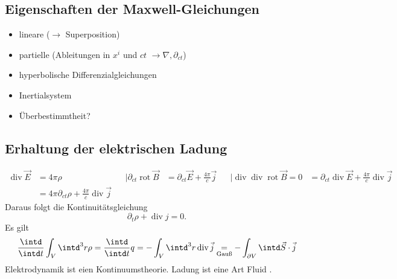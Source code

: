 \documentclass{article}
\newcommand{\rot}{\operatorname{rot}}
\renewcommand{\div}{\operatorname{div}}
\begin{document}
\subsection*{Eigenschaften der Maxwell-Gleichungen}
\begin{itemize}
    \item lineare ($\to$ Superposition)
    \item partielle (Ableitungen in $x^i$ und $ct$ $\to \nabla, \partial_{ct}$)
    \item hyperbolische Differenzialgleichungen
    \item Inertialsystem
    \item Überbestimmtheit?
\end{itemize}
\subsection*{Erhaltung der elektrischen Ladung}
\begin{align*}
    \div \vec E &= 4\pi \rho &&| \partial_{ct}
    \rot \vec B &= \partial_{ct} \vec E + \frac{4\pi}{c} \vec{j} &&| \div
    \div \rot \vec B = 0 &= \partial_{ct} \div \vec E + \frac{4\pi}{c} \div \vec j\\
    &= 4\pi \partial_{ct} \rho + \frac{4\pi}{c} \div \vec j
\end{align*}
Daraus folgt die Kontinuitätsgleichung
\[
    \partial_{t} \rho + \div j = 0.  
\]
Es gilt
\[
    \frac{\intd}{\intd t} \int_V \intd^3 r \rho = \frac{\intd}{\intd t} q = - \int_V \intd^3 r \div \vec j \underset{\text{Gauß}}{=} -\int_{\partial V} \intd \vec S \cdot \vec j
\]
Elektrodynamik ist eien Kontinuumstheorie. Ladung ist eine Art \glqq Fluid \grqq.
\end{document}
